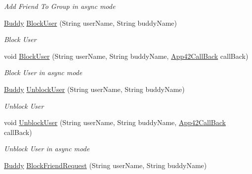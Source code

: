 \begin{DoxyCompactItemize}
\begin{DoxyCompactList}\small\item\em Add Friend To Group in async mode \end{DoxyCompactList}\item 
\hyperlink{classcom_1_1shephertz_1_1app42_1_1paas_1_1sdk_1_1csharp_1_1buddy_1_1_buddy}{Buddy} \hyperlink{classcom_1_1shephertz_1_1app42_1_1paas_1_1sdk_1_1csharp_1_1buddy_1_1_buddy_service_a0f71a394f985702f0965831345059b30}{Block\+User} (String user\+Name, String buddy\+Name)
\begin{DoxyCompactList}\small\item\em Block User \end{DoxyCompactList}\item 
void \hyperlink{classcom_1_1shephertz_1_1app42_1_1paas_1_1sdk_1_1csharp_1_1buddy_1_1_buddy_service_ac32bdbae3fa9a63c7e9fb9a1a0a04179}{Block\+User} (String user\+Name, String buddy\+Name, \hyperlink{interfacecom_1_1shephertz_1_1app42_1_1paas_1_1sdk_1_1csharp_1_1_app42_call_back}{App42\+Call\+Back} call\+Back)
\begin{DoxyCompactList}\small\item\em Block User in async mode \end{DoxyCompactList}\item 
\hyperlink{classcom_1_1shephertz_1_1app42_1_1paas_1_1sdk_1_1csharp_1_1buddy_1_1_buddy}{Buddy} \hyperlink{classcom_1_1shephertz_1_1app42_1_1paas_1_1sdk_1_1csharp_1_1buddy_1_1_buddy_service_a718b43febe9d7b26ecdfcc21a8db2e3c}{Unblock\+User} (String user\+Name, String buddy\+Name)
\begin{DoxyCompactList}\small\item\em Unblock User \end{DoxyCompactList}\item 
void \hyperlink{classcom_1_1shephertz_1_1app42_1_1paas_1_1sdk_1_1csharp_1_1buddy_1_1_buddy_service_abf1e14352963d117b2f7ee90110d07c3}{Unblock\+User} (String user\+Name, String buddy\+Name, \hyperlink{interfacecom_1_1shephertz_1_1app42_1_1paas_1_1sdk_1_1csharp_1_1_app42_call_back}{App42\+Call\+Back} call\+Back)
\begin{DoxyCompactList}\small\item\em Unblock User in async mode \end{DoxyCompactList}\item 
\hyperlink{classcom_1_1shephertz_1_1app42_1_1paas_1_1sdk_1_1csharp_1_1buddy_1_1_buddy}{Buddy} \hyperlink{classcom_1_1shephertz_1_1app42_1_1paas_1_1sdk_1_1csharp_1_1buddy_1_1_buddy_service_a74810a34fb73f69154d6aae718afb062}{Block\+Friend\+Request} (String user\+Name, String buddy\+Name)

\end{DoxyCompactItemize}
